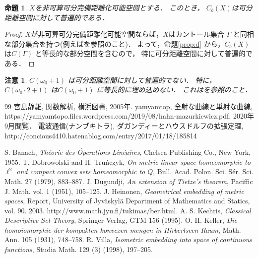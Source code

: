 \documentclass[leqno, a4paper, 12pt]{jsarticle}
\newtheorem{prop}[thm]{命題}
\newtheorem*{rmk}{注意}
\begin{document}
\begin{prop}
$X$を非可算可分完備距離化可能空間とする．
このとき，
$C_b(X)$は可分距離空間に対して普遍的である．
\end{prop}
\begin{proof}
$X$が非可算可分完備距離化可能空間ならば，$X$はカントール集合
$\Gamma$
と同相な部分集合を持つ(例えば\cite[Corollary 6.5]{K}を参照のこと)．
よって，命題\ref{prop:d}
から，$C_b(X)$は$C(\Gamma)$
と等長的な部分空間を含むので，
特に可分距離空間に対して普遍的である．
\end{proof}




\begin{rmk}
$C(\omega_0+1)$
は可分距離空間に対して普遍的でない．
特に，$C(\omega_0\cdot 2+1)$
は$C(\omega_0+1)$
に等長的に埋め込めない．
これは\emph{\cite[Lemma 5]{V}}を参照のこと．
\end{rmk}













	
\begin{thebibliography}{99}
宮島静雄, 関数解析, 
横浜図書, 2005年.
yamyamtop, 全射な曲線と単射な曲線, \\
https://yamyamtopo.files.wordpress.com/2019/08/hahn-mazurkiewicz.pdf, 
2020年9月閲覧．
電波通信(ナンブキトラ), ダガンディーとハウスドルフの拡張定理, 
http://concious4410.hatenablog.com/entry/2017/01/18/185814

S. Banach, \textit{Th\'eorie des \'Operations Lin\'eaires},  
Chelsea Publishing Co., New
York, 1955. 
T. Dobrowolski and H. Tru\'nczyk, 
\textit{On metric linear space homeomorphic to $\ell^2$ and compact convex sets homeomorphic to $Q$}, Bull. Acad. Polon. Sci. S\'er. Sci. Math. 
27 (1979), 883--887. 
J. Dugundji, \textit{An extension of Tietze's theorem}, 
Paciffic J. Math. vol. 1 (1951), 105--125. 
J. Heinonen, \textit{Geometrical embedding of metric spaces}, Report, University of Jyv\"askyl\"a Department of Mathematics and Statics, vol. 90. 2003. http://www.math.jyu.fi/tukimas/ber.html.
A. S. Kechris, \textit{Classical Descriptive Set Theory}, 
Springer-Verlag, GTM 156 (1995). 
O. H. Keller, \textit{Die homoiomorphie der kompakten konvexen mengen in Hirbertscen Raum}, 
Math. Ann. 105 (1931), 748--758. 
R. Villa, \textit{Isometric embedding into space of continuous functions}, 
Studia Math. 129 (3) (1998), 
197--205. 
\end{thebibliography}




			
\end{document}
